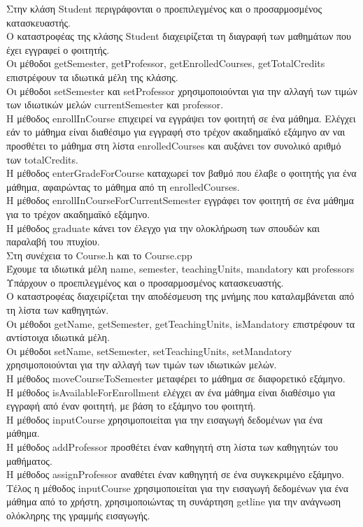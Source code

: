 \documentclass[12pt]{article}
\begin{document}
Στην κλάση Student περιγράφονται ο προεπιλεγμένος και ο προσαρμοσμένος κατασκευαστής.\\
Ο καταστροφέας της κλάσης Student διαχειρίζεται τη διαγραφή των μαθημάτων που έχει εγγραφεί ο φοιτητής.\\
Οι μέθοδοι getSemester, getProfessor, getEnrolledCourses, getTotalCredits επιστρέφουν τα ιδιωτικά μέλη της κλάσης.\\
Οι μέθοδοι setSemester και setProfessor χρησιμοποιούνται για την αλλαγή των τιμών των ιδιωτικών μελών currentSemester και professor.\\
Η μέθοδος enrollInCourse επιχειρεί να εγγράψει τον φοιτητή σε ένα μάθημα. Ελέγχει εάν το μάθημα είναι διαθέσιμο για εγγραφή στο τρέχον ακαδημαϊκό εξάμηνο αν ναι προσθέτει το μάθημα στη λίστα enrolledCourses και αυξάνει τον συνολικό αριθμό των totalCredits.\\
Η μέθοδος enterGradeForCourse καταχωρεί τον βαθμό που έλαβε ο φοιτητής για ένα μάθημα, αφαιρώντας το μάθημα από τη enrolledCourses.\\
Η μέθοδος enrollInCourseForCurrentSemester εγγράφει τον φοιτητή σε ένα μάθημα για το τρέχον ακαδημαϊκό εξάμηνο.\\
Η μέθοδος graduate κάνει τον έλεγχο για την ολοκλήρωση των σπουδών και παραλαβή του πτυχίου.\\

Στη συνέχεια το Course.h και το Course.cpp\\

Έχουμε τα ιδιωτικά μέλη name, semester, teachingUnits, mandatory και professors\\
Υπάρχουν ο προεπιλεγμένος και ο προσαρμοσμένος κατασκευαστής.\\
Ο καταστροφέας διαχειρίζεται την αποδέσμευση της μνήμης που καταλαμβάνεται από τη λίστα των καθηγητών.\\
Οι μέθοδοι getName, getSemester, getTeachingUnits, isMandatory επιστρέφουν τα αντίστοιχα ιδιωτικά μέλη.\\
Οι μέθοδοι setName, setSemester, setTeachingUnits, setMandatory χρησιμοποιούνται για την αλλαγή των τιμών των ιδιωτικών μελών.\\
Η μέθοδος moveCourseToSemester μεταφέρει το μάθημα σε διαφορετικό εξάμηνο.\\
Η μέθοδος isAvailableForEnrollment ελέγχει αν ένα μάθημα είναι διαθέσιμο για εγγραφή από έναν φοιτητή, με βάση το εξάμηνο του φοιτητή.\\
Η μέθοδος inputCourse χρησιμοποιείται για την εισαγωγή δεδομένων για ένα μάθημα.\\
Η μέθοδος addProfessor προσθέτει έναν καθηγητή στη λίστα των καθηγητών του μαθήματος.\\
Η μέθοδος assignProfessor αναθέτει έναν καθηγητή σε ένα συγκεκριμένο εξάμηνο.\\
Τέλος η μέθοδος inputCourse χρησιμοποιείται για την εισαγωγή δεδομένων για ένα μάθημα από το χρήστη, χρησιμοποιώντας τη συνάρτηση getline για την ανάγνωση ολόκληρης της γραμμής εισαγωγής.\\
\end{document}

